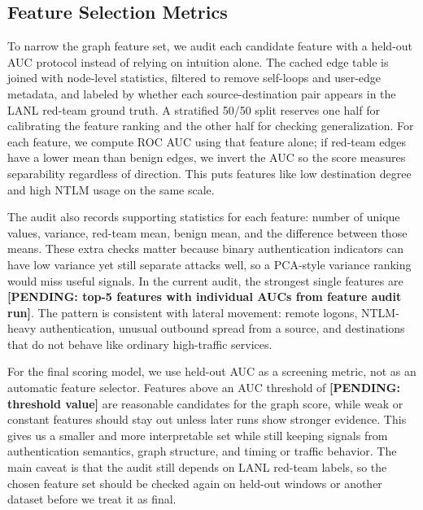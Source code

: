 \subsection{Feature Selection Metrics}
\label{sec:feature_selection}

To narrow the graph feature set, we audit each candidate feature with a held-out AUC protocol instead of relying on intuition alone. The cached edge table is joined with node-level statistics, filtered to remove self-loops and user-edge metadata, and labeled by whether each source-destination pair appears in the LANL red-team ground truth. A stratified 50/50 split reserves one half for calibrating the feature ranking and the other half for checking generalization. For each feature, we compute ROC AUC using that feature alone; if red-team edges have a lower mean than benign edges, we invert the AUC so the score measures separability regardless of direction. This puts features like low destination degree and high NTLM usage on the same scale.

The audit also records supporting statistics for each feature: number of unique values, variance, red-team mean, benign mean, and the difference between those means. These extra checks matter because binary authentication indicators can have low variance yet still separate attacks well, so a PCA-style variance ranking would miss useful signals. In the current audit, the strongest single features are \textbf{[PENDING: top-5 features with individual AUCs from feature audit run]}. The pattern is consistent with lateral movement: remote logons, NTLM-heavy authentication, unusual outbound spread from a source, and destinations that do not behave like ordinary high-traffic services.

For the final scoring model, we use held-out AUC as a screening metric, not as an automatic feature selector. Features above an AUC threshold of \textbf{[PENDING: threshold value]} are reasonable candidates for the graph score, while weak or constant features should stay out unless later runs show stronger evidence. This gives us a smaller and more interpretable set while still keeping signals from authentication semantics, graph structure, and timing or traffic behavior. The main caveat is that the audit still depends on LANL red-team labels, so the chosen feature set should be checked again on held-out windows or another dataset before we treat it as final.
